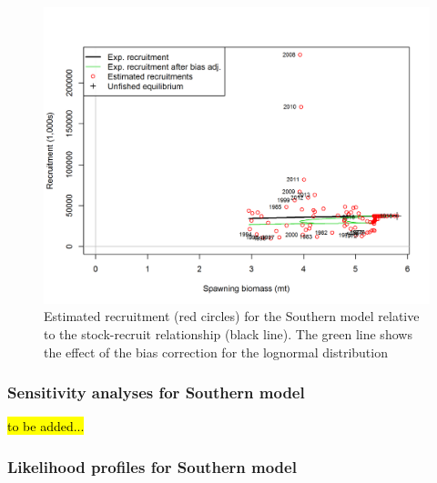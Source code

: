 \documentclass[12pt,]{article}
\begin{document}
\FloatBarrier

\begin{figure}[htbp]
\centering
\includegraphics{r4ss/plots_mod2/SR_curve2.png}
\caption{Estimated recruitment (red circles) for the Southern model
relative to the stock-recruit relationship (black line). The green line
shows the effect of the bias correction for the lognormal distribution
\label{fig:stock_recruit_curve.S}}
\end{figure}

\FloatBarrier

\newpage

\subsubsection{Sensitivity analyses for Southern
model}\label{sensitivity-analyses-for-southern-model}

\hl{to be added...}

\subsubsection{Likelihood profiles for Southern
model}\label{likelihood-profiles-for-southern-model}
\end{document}
